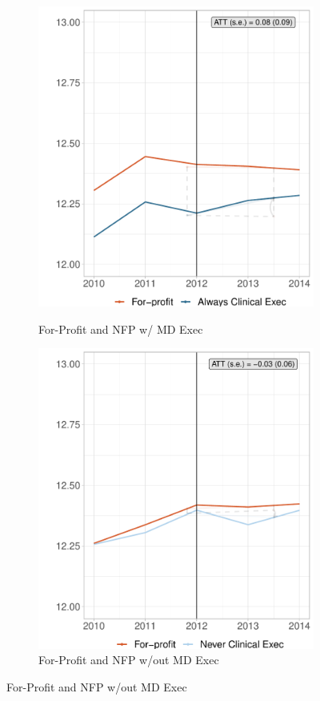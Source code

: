 \documentclass[12pt]{article}
\begin{document}
    \begin{figure}[ht!]
     \caption{Mortality Rate Synthetic Difference in Differences Results}
     \centering
     \begin{subfigure}[b]{0.45\textwidth}
         \centering
         \caption{For-Profit and NFP w/ MD Exec}
         \includegraphics[width=\textwidth]{Objects/fp_mort_md_synth_graph.pdf}
         \label{fig:mort_synth_plotb}
     \end{subfigure}%
     \hfill
     \begin{subfigure}[b]{0.45\textwidth}
         \centering
         \caption{For-Profit and NFP w/out MD Exec}
         \includegraphics[width=\textwidth]{Objects/fp_mort_nomd_synth_graph.pdf}

\end{subfigure}
\end{figure}
\end{document}

